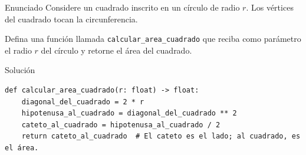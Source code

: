 \documentclass{ip-quiz}
\begin{document}
\makeheader
\maketitle

\begin{sectionbox}{Enunciado}
Considere un cuadrado inscrito en un círculo de radio $r$. Los vértices del cuadrado tocan la circunferencia.

\begin{center}
\end{center}

Defina una función llamada \texttt{calcular\_area\_cuadrado} que reciba como parámetro el radio $r$ del círculo y retorne el área del cuadrado.
\end{sectionbox}

\begin{sectionbox}{Solución}
\begin{verbatim}
def calcular_area_cuadrado(r: float) -> float:
    diagonal_del_cuadrado = 2 * r
    hipotenusa_al_cuadrado = diagonal_del_cuadrado ** 2
    cateto_al_cuadrado = hipotenusa_al_cuadrado / 2
    return cateto_al_cuadrado  # El cateto es el lado; al cuadrado, es el área.
\end{verbatim}
\end{sectionbox}
\end{document}
